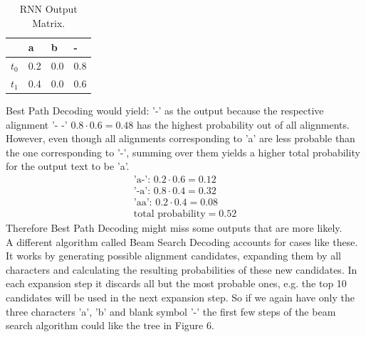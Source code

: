 \documentclass{article}
\begin{document}
\begin{table}[H]
\centering
\begin{tabular}{l|l|l|l}
       & a & b & - \\ \hline
\(t_0\) & 0.2 & 0.0 & 0.8 \\ \hline
\(t_1\) & 0.4 & 0.0 & 0.6 \\ \hline
\end{tabular}
\caption{RNN Output Matrix.}
\end{table}
Best Path Decoding would yield: '-' as the output because the respective alignment '- -' \(0.8\cdot 0.6 = 0.48\) has the highest probability out of all alignments. However, even though all alignments corresponding to 'a' are less probable than the one corresponding to '-', summing over them yields a higher total probability for the output text to be 'a'. 
\[
\begin{split}
\text{'a-': } 0.2\cdot 0.6 = 0.12\\
\text{'-a': } 0.8\cdot 0.4 = 0.32\\
\text{'aa': } 0.2\cdot 0.4 = 0.08\\
\text{total probability} = 0.52
\end{split}
\]
Therefore Best Path Decoding might miss some outputs that are more likely.\\
A different algorithm called Beam Search Decoding accounts for cases like these. It works by generating possible alignment candidates, expanding them by all characters and calculating the resulting probabilities of these new candidates. In each expansion step it discards all but the most probable ones, e.g. the top 10 candidates will be used in the next expansion step. So if we again have only the three characters 'a', 'b' and blank symbol '-' the first few steps of the beam search algorithm could like the tree in Figure 6.
\end{document}
